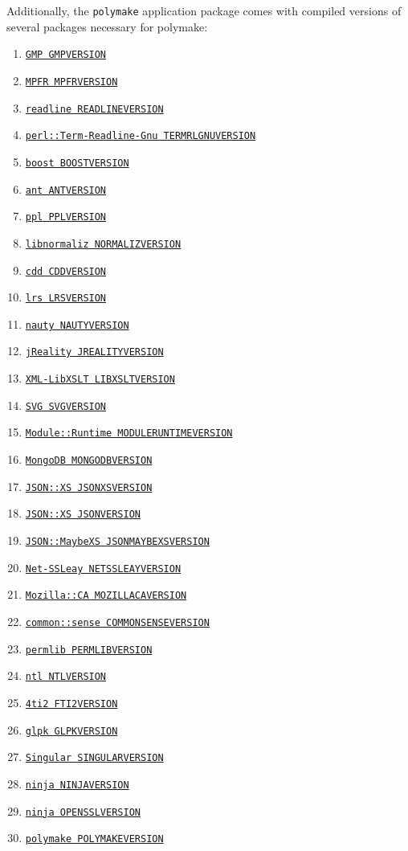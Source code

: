 \documentclass[a4paper]{amsart}
\newcommand{\polymake}{\texttt{polymake}\xspace}
\begin{document}
Additionally, the \polymake application package comes with compiled versions of several packages necessary for polymake: 
\begin{enumerate}
\item \href{GMPHOME}{\texttt{GMP GMPVERSION}}
\item \href{MPFRHOME}{\texttt{MPFR MPFRVERSION}}
\item \href{READLINEHOME}{\texttt{readline READLINEVERSION}}
\item \href{TERMRLGNUHOME}{\texttt{perl::Term-Readline-Gnu TERMRLGNUVERSION}}
\item \href{BOOSTHOME}{\texttt{boost BOOSTVERSION}}
\item \href{ANTHOME}{\texttt{ant ANTVERSION}}
\item \href{PPLHOME}{\texttt{ppl PPLVERSION}}
\item \href{NORMALIZHOME}{\texttt{libnormaliz NORMALIZVERSION}}
\item \href{CDDHOME}{\texttt{cdd CDDVERSION}}
\item \href{LRSHOME}{\texttt{lrs LRSVERSION}}
\item \href{NAUTYHOME}{\texttt{nauty NAUTYVERSION}}
\item \href{JREALITYHOME}{\texttt{jReality JREALITYVERSION}}
\item \href{LIBXSLTHOME}{\texttt{XML-LibXSLT LIBXSLTVERSION}}
\item \href{SVGHOME}{\texttt{SVG SVGVERSION}}
\item \href{MODULERUNTIMEHOME}{\texttt{Module::Runtime MODULERUNTIMEVERSION}}
\item \href{MONGODBHOME}{\texttt{MongoDB MONGODBVERSION}}
\item \href{JSONXSHOME}{\texttt{JSON::XS JSONXSVERSION}}
\item \href{JSONHOME}{\texttt{JSON::XS JSONVERSION}}
\item \href{JSONMAYBEXSHOME}{\texttt{JSON::MaybeXS JSONMAYBEXSVERSION}}
\item \href{NETSSLEAYHOME}{\texttt{Net-SSLeay NETSSLEAYVERSION}}
\item \href{MOZILLACAHOME}{\texttt{Mozilla::CA MOZILLACAVERSION}}
\item \href{COMMONSENSEHOME}{\texttt{common::sense COMMONSENSEVERSION}}
\item \href{PERMLIBHOME}{\texttt{permlib PERMLIBVERSION}}
\item \href{NTLHOME}{\texttt{ntl NTLVERSION}}
\item \href{FTI2HOME}{\texttt{4ti2 FTI2VERSION}}
\item \href{GLPKHOME}{\texttt{glpk GLPKVERSION}}
\item \href{SINGULARHOME}{\texttt{Singular SINGULARVERSION}}
\item \href{NINJAHOME}{\texttt{ninja NINJAVERSION}}
\item \href{OPENSSLHOME}{\texttt{ninja OPENSSLVERSION}}
\item \href{POLYMAKEHOME}{\texttt{polymake POLYMAKEVERSION}}
\end{enumerate}
\end{document}
